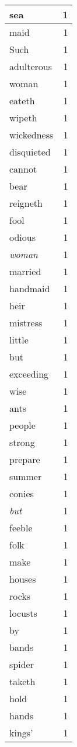 \begin{center}
\begin{longtable}{l|r}
sea & 1\\ \hline 
maid & 1\\ \hline 
Such & 1\\ \hline 
adulterous & 1\\ \hline 
woman & 1\\ \hline 
eateth & 1\\ \hline 
wipeth & 1\\ \hline 
wickedness & 1\\ \hline 
disquieted & 1\\ \hline 
cannot & 1\\ \hline 
bear & 1\\ \hline 
reigneth & 1\\ \hline 
fool & 1\\ \hline 
odious & 1\\ \hline 
\emph{woman} & 1\\ \hline 
married & 1\\ \hline 
handmaid & 1\\ \hline 
heir & 1\\ \hline 
mistress & 1\\ \hline 
little & 1\\ \hline 
but & 1\\ \hline 
exceeding & 1\\ \hline 
wise & 1\\ \hline 
ants & 1\\ \hline 
people & 1\\ \hline 
strong & 1\\ \hline 
prepare & 1\\ \hline 
summer & 1\\ \hline 
conies & 1\\ \hline 
\emph{but} & 1\\ \hline 
feeble & 1\\ \hline 
folk & 1\\ \hline 
make & 1\\ \hline 
houses & 1\\ \hline 
rocks & 1\\ \hline 
locusts & 1\\ \hline 
by & 1\\ \hline 
bands & 1\\ \hline 
spider & 1\\ \hline 
taketh & 1\\ \hline 
hold & 1\\ \hline 
hands & 1\\ \hline 
kings' & 1\\ \hline 

\end{longtable}
\end{center}
